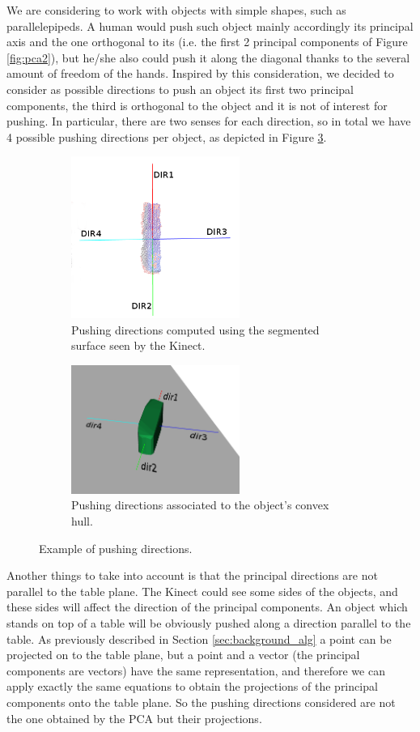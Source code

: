 We are considering to work with objects with simple shapes, such as parallelepipeds. 
A human would push such object mainly accordingly its principal axis and the one orthogonal to its (i.e. the first 2 principal components of Figure \ref{fig:pca2}), but he/she also could push it along the diagonal thanks to the several amount of freedom of the hands. 
Inspired by this consideration, we decided to consider as possible directions to push an object  its first two principal components, the third is orthogonal to the object and it is not of interest for pushing. In particular, there are two senses for each direction, so in total we have 4 possible pushing directions per object, as depicted in Figure \ref{fig:directions}.

\begin{figure}
\centering
\begin{subfigure}[t]{6cm}
\includegraphics[width=5.5cm]{Img/pushing/directions.png}
\caption{Pushing directions computed using the segmented surface seen by the Kinect.}\label{fig:directions1}
\end{subfigure}
\quad
\begin{subfigure}[t]{6cm}
\includegraphics[width=5.5cm]{Img/pushing/directions2.png}
\caption{Pushing directions associated to the object's convex hull.}
\label{fig:directions2}
\end{subfigure}
\caption{Example of pushing directions.}\label{fig:directions}
\end{figure}

Another things to take into account is that the principal directions are not parallel to the table plane. The Kinect could see some sides of the objects, and these sides will affect the direction of the principal components. An object which stands on top of a table will be obviously pushed along a direction parallel to the table. As previously described in Section \ref{sec:background_alg} a point can be projected on to the table plane, but a point and a vector (the principal components are vectors) have the same representation, and therefore we can apply exactly the same equations to obtain the projections of the principal components onto the table plane. So the pushing directions considered are not the one obtained by the PCA but their projections. 


